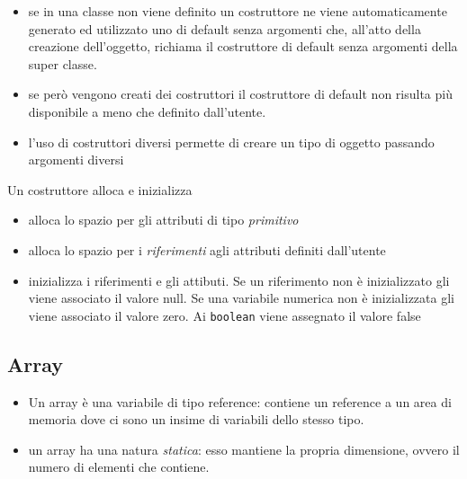 \documentclass{article}
\theoremstyle{definition}
\begin{document}
\begin{itemize}
\item se in una classe non viene definito un costruttore ne viene automaticamente generato ed utilizzato uno di default senza argomenti che, all'atto della creazione dell'oggetto, richiama il costruttore di default senza argomenti della super classe.
\item se per\`o vengono creati dei costruttori il costruttore di default non risulta pi\`u disponibile a meno che definito dall'utente. 
\item l'uso di costruttori diversi permette di creare un tipo di oggetto passando argomenti diversi 
\end{itemize}

Un costruttore alloca e inizializza
\begin{itemize}
\item alloca lo spazio per gli attributi di tipo \emph{primitivo}
\item alloca lo spazio per i \emph{riferimenti} agli attributi definiti dall'utente
\item inizializza i riferimenti e gli attibuti. Se un riferimento non \`e inizializzato gli viene associato il valore null. Se una variabile numerica non \`e inizializzata gli viene associato il valore zero. Ai \texttt{boolean} viene assegnato il valore false
\end{itemize}


\subsection{Array}
\begin{itemize}
\item Un array \`e una variabile di tipo reference: contiene un reference a un area di memoria dove ci sono un insime di variabili dello stesso tipo.
\item un array ha una natura \emph{statica}: esso mantiene la propria dimensione, ovvero il numero di elementi che contiene.
\end{itemize}
\end{document}

